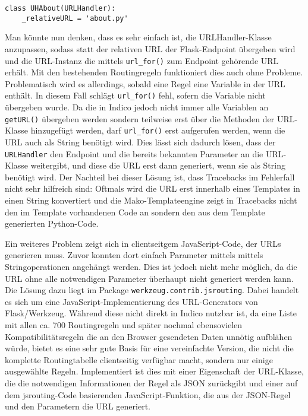 \begin{lstlisting}[caption=URLHandler für about.py]
class UHAbout(URLHandler):
    _relativeURL = 'about.py'
\end{lstlisting}

Man könnte nun denken, dass es sehr einfach ist, die URLHandler-Klasse anzupassen, sodass statt der
relativen URL der Flask-Endpoint übergeben wird und die URL-Instanz die mittels
\lstinline{url_for()} zum Endpoint gehörende URL erhält. Mit den bestehenden Routingregeln
funktioniert dies auch ohne Probleme. Problematisch wird es allerdings, sobald eine Regel eine
Variable in der URL enthält. In diesem Fall schlägt \lstinline{url_for()} fehl, sofern die Variable
nicht übergeben wurde. Da die in Indico jedoch nicht immer alle Variablen an \lstinline{getURL()}
übergeben werden sondern teilweise erst über die Methoden der URL-Klasse hinzugefügt werden, darf
\lstinline{url_for()} erst aufgerufen werden, wenn die URL auch als String benötigt wird. Dies lässt
sich dadurch lösen, dass der \lstinline{URLHandler} den Endpoint und die bereits bekannten Parameter
an die URL-Klasse weitergibt, und diese die URL erst dann generiert, wenn sie als String benötigt
wird. Der Nachteil bei dieser Lösung ist, dass Tracebacks im Fehlerfall nicht sehr hilfreich sind:
Oftmals wird die URL erst innerhalb eines Templates in einen String konvertiert und die
Mako-Templateengine zeigt in Tracebacks nicht den im Template vorhandenen Code an sondern den aus
dem Template generierten Python-Code.

Ein weiteres Problem zeigt sich in clientseitgem JavaScript-Code, der URLs generieren muss. Zuvor
konnten dort einfach Parameter mittels mittels Stringoperationen angehängt werden. Dies ist jedoch
nicht mehr möglich, da die URL ohne alle notwendigen Parameter überhaupt nicht generiert werden
kann. Die Lösung dazu liegt im Package \lstinline{werkzeug.contrib.jsrouting}. Dabei handelt es sich
um eine JavaScript-Implementierung des URL-Generators von Flask/Werkzeug. Während diese nicht direkt
in Indico nutzbar ist, da eine Liste mit allen ca. 700 Routingregeln und später nochmal ebensovielen
Kompatibilitätsregeln die an den Browser gesendeten Daten unnötig aufblähen würde, bietet es eine
sehr gute Basis für eine vereinfachte Version, die nicht die komplette Routingtabelle clientseitig
verfügbar macht, sondern nur einige ausgewählte Regeln. Implementiert ist dies mit einer Eigenschaft
der URL-Klasse, die die notwendigen Informationen der Regel als JSON zurückgibt und einer auf dem
jsrouting-Code basierenden JavaScript-Funktion, die aus der JSON-Regel und den Parametern die URL
generiert.

